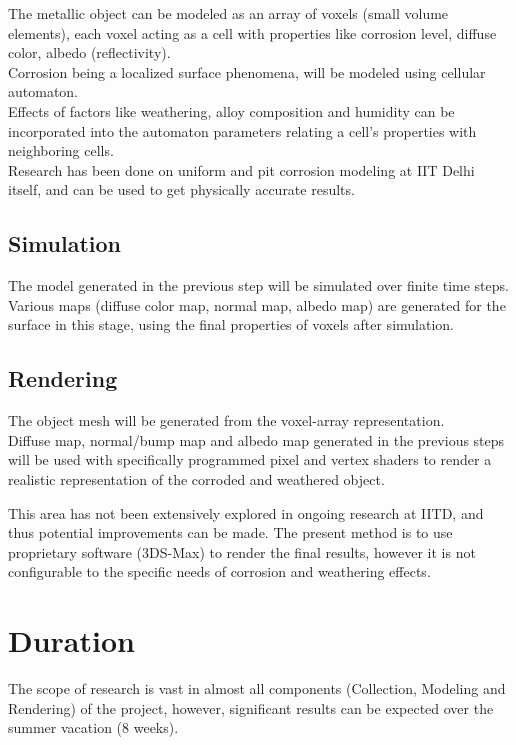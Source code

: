 \documentclass[12pt]{article}
\begin{document}
The metallic object can be modeled as an array of voxels (small volume elements), each voxel acting as a cell with properties like corrosion level, diffuse color, albedo (reflectivity).\\
Corrosion being a localized surface phenomena, will be modeled using cellular automaton.\\
Effects of factors like weathering, alloy composition and humidity can be incorporated into the automaton parameters relating a cell's properties with neighboring cells.\\

Research has been done on uniform and pit corrosion modeling at IIT Delhi itself, and can be used to get physically accurate results.

\subsection{Simulation}

The model generated in the previous step will be simulated over finite time steps.\\
Various maps (diffuse color map, normal map, albedo map) are generated for the surface in this stage, using the final properties of voxels after simulation.

\subsection{Rendering}

The object mesh will be generated from the voxel-array representation.\\
Diffuse map, normal/bump map and albedo map generated in the previous steps will be used with specifically programmed pixel and vertex shaders to render a realistic representation of the corroded and weathered object.

This area has not been extensively explored in ongoing research at IITD, and thus potential improvements can be made. The present method is to use proprietary software (3DS-Max) to render the final results, however it is not configurable to the specific needs of corrosion and weathering effects.


\section{Duration}
The scope of research is vast in almost all components (Collection, Modeling and Rendering) of the project, however, significant results can be expected over the summer vacation (8 weeks). 
\end{document}
